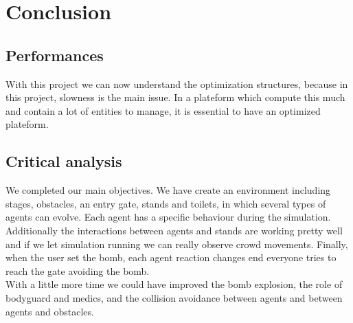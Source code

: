 \chapter*{Conclusion}

\section*{Performances}

With this project we can now understand the optimization structures, because in this project, slowness is the main issue. In a plateform which compute this much and contain a lot of entities to manage, it is essential to have an optimized plateform.

\section*{Critical analysis}

We completed our main objectives. We have create an environment including stages, obstacles, an entry gate, stands and toilets, in which several types of agents can evolve. Each agent has a specific behaviour during the simulation. Additionally the interactions between agents and stands are working pretty well and if we let simulation running we can really observe crowd movements. Finally, when the user set the bomb, each agent reaction changes end everyone tries to reach the gate avoiding the bomb.\\

With a little more time we could have improved the bomb explosion, the role of bodyguard and medics, and the collision avoidance between agents and between agents and obstacles.